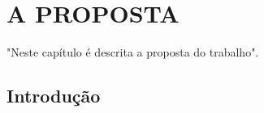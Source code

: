 

\chapter[A PROPOSTA]{A PROPOSTA}

"Neste capítulo é descrita a proposta do trabalho".		


\section{Introdução}




